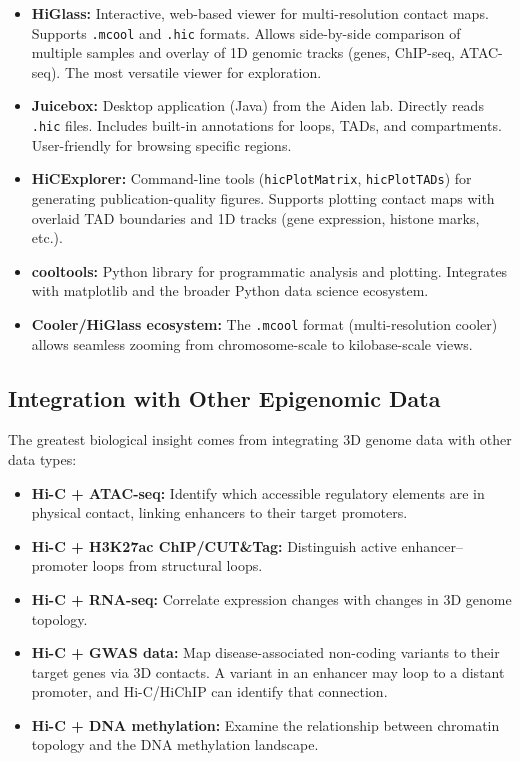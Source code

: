 \begin{itemize}[itemsep=3pt]
  \item \textbf{HiGlass:} Interactive, web-based viewer for multi-resolution contact maps. Supports \texttt{.mcool} and \texttt{.hic} formats. Allows side-by-side comparison of multiple samples and overlay of 1D genomic tracks (genes, ChIP-seq, ATAC-seq). The most versatile viewer for exploration.
  \item \textbf{Juicebox:} Desktop application (Java) from the Aiden lab. Directly reads \texttt{.hic} files. Includes built-in annotations for loops, TADs, and compartments. User-friendly for browsing specific regions.
  \item \textbf{HiCExplorer:} Command-line tools (\texttt{hicPlotMatrix}, \texttt{hicPlotTADs}) for generating publication-quality figures. Supports plotting contact maps with overlaid TAD boundaries and 1D tracks (gene expression, histone marks, etc.).
  \item \textbf{cooltools:} Python library for programmatic analysis and plotting. Integrates with matplotlib and the broader Python data science ecosystem.
  \item \textbf{Cooler/HiGlass ecosystem:} The \texttt{.mcool} format (multi-resolution cooler) allows seamless zooming from chromosome-scale to kilobase-scale views.
\end{itemize}

\subsection{Integration with Other Epigenomic Data}
\label{subsec:3dgenome:integration}

The greatest biological insight comes from integrating 3D genome data with other data types:

\begin{itemize}[itemsep=2pt]
  \item \textbf{Hi-C + ATAC-seq:} Identify which accessible regulatory elements are in physical contact, linking enhancers to their target promoters.
  \item \textbf{Hi-C + H3K27ac ChIP/CUT\&Tag:} Distinguish active enhancer--promoter loops from structural loops.
  \item \textbf{Hi-C + RNA-seq:} Correlate expression changes with changes in 3D genome topology.
  \item \textbf{Hi-C + GWAS data:} Map disease-associated non-coding variants to their target genes via 3D contacts. A variant in an enhancer may loop to a distant promoter, and Hi-C/HiChIP can identify that connection.
  \item \textbf{Hi-C + DNA methylation:} Examine the relationship between chromatin topology and the DNA methylation landscape.
\end{itemize}

